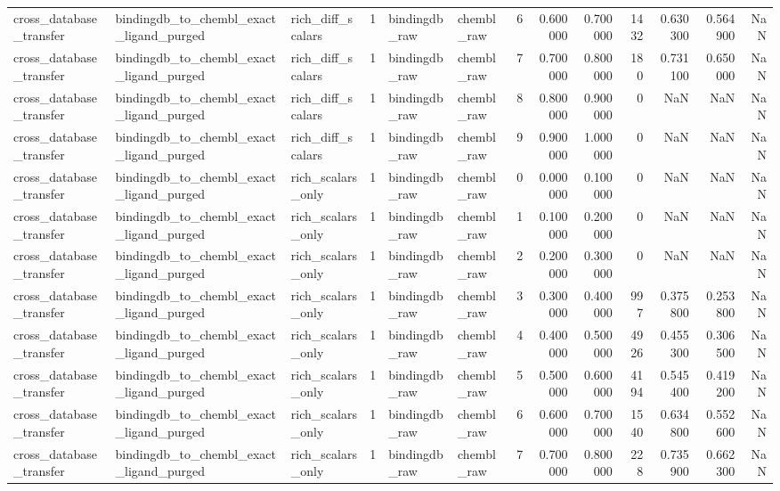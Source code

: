 \begin{longtable}{lllrllrrrrrrr}
cross\_database\_transfer & bindingdb\_to\_chembl\_exact\_ligand\_purged & rich\_diff\_scalars & 1 & bindingdb\_raw & chembl\_raw & 6 & 0.600000 & 0.700000 & 1432 & 0.630300 & 0.564900 & NaN \\
cross\_database\_transfer & bindingdb\_to\_chembl\_exact\_ligand\_purged & rich\_diff\_scalars & 1 & bindingdb\_raw & chembl\_raw & 7 & 0.700000 & 0.800000 & 180 & 0.731100 & 0.650000 & NaN \\
cross\_database\_transfer & bindingdb\_to\_chembl\_exact\_ligand\_purged & rich\_diff\_scalars & 1 & bindingdb\_raw & chembl\_raw & 8 & 0.800000 & 0.900000 & 0 & NaN & NaN & NaN \\
cross\_database\_transfer & bindingdb\_to\_chembl\_exact\_ligand\_purged & rich\_diff\_scalars & 1 & bindingdb\_raw & chembl\_raw & 9 & 0.900000 & 1.000000 & 0 & NaN & NaN & NaN \\
cross\_database\_transfer & bindingdb\_to\_chembl\_exact\_ligand\_purged & rich\_scalars\_only & 1 & bindingdb\_raw & chembl\_raw & 0 & 0.000000 & 0.100000 & 0 & NaN & NaN & NaN \\
cross\_database\_transfer & bindingdb\_to\_chembl\_exact\_ligand\_purged & rich\_scalars\_only & 1 & bindingdb\_raw & chembl\_raw & 1 & 0.100000 & 0.200000 & 0 & NaN & NaN & NaN \\
cross\_database\_transfer & bindingdb\_to\_chembl\_exact\_ligand\_purged & rich\_scalars\_only & 1 & bindingdb\_raw & chembl\_raw & 2 & 0.200000 & 0.300000 & 0 & NaN & NaN & NaN \\
cross\_database\_transfer & bindingdb\_to\_chembl\_exact\_ligand\_purged & rich\_scalars\_only & 1 & bindingdb\_raw & chembl\_raw & 3 & 0.300000 & 0.400000 & 997 & 0.375800 & 0.253800 & NaN \\
cross\_database\_transfer & bindingdb\_to\_chembl\_exact\_ligand\_purged & rich\_scalars\_only & 1 & bindingdb\_raw & chembl\_raw & 4 & 0.400000 & 0.500000 & 4926 & 0.455300 & 0.306500 & NaN \\
cross\_database\_transfer & bindingdb\_to\_chembl\_exact\_ligand\_purged & rich\_scalars\_only & 1 & bindingdb\_raw & chembl\_raw & 5 & 0.500000 & 0.600000 & 4194 & 0.545400 & 0.419200 & NaN \\
cross\_database\_transfer & bindingdb\_to\_chembl\_exact\_ligand\_purged & rich\_scalars\_only & 1 & bindingdb\_raw & chembl\_raw & 6 & 0.600000 & 0.700000 & 1540 & 0.634800 & 0.552600 & NaN \\
cross\_database\_transfer & bindingdb\_to\_chembl\_exact\_ligand\_purged & rich\_scalars\_only & 1 & bindingdb\_raw & chembl\_raw & 7 & 0.700000 & 0.800000 & 228 & 0.735900 & 0.662300 & NaN \\

\end{longtable}
